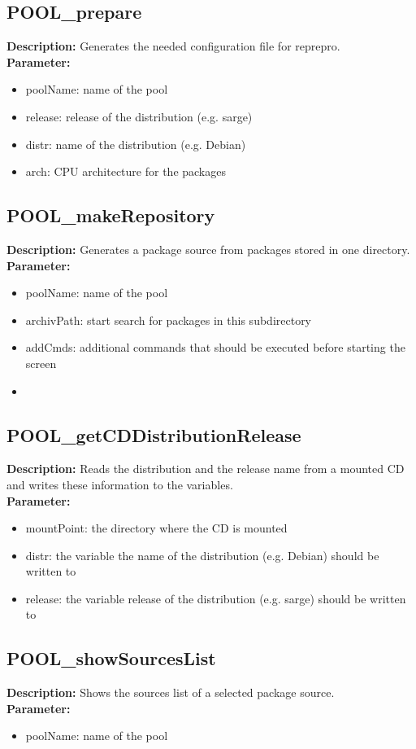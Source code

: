 \subsection{POOL\_prepare}
\textbf{Description:} Generates the needed configuration file for reprepro.\\
\textbf{Parameter:}
\begin{itemize}
\item poolName: name of the pool
\item release: release of the distribution (e.g. sarge)
\item distr: name of the distribution (e.g. Debian)
\item arch: CPU architecture for the packages
\end{itemize}

\subsection{POOL\_makeRepository}
\textbf{Description:} Generates a package source from packages stored in one directory.\\
\textbf{Parameter:}
\begin{itemize}
\item poolName: name of the pool
\item archivPath: start search for packages in this subdirectory
\item addCmds: additional commands that should be executed before starting the screen
\item 
\end{itemize}

\subsection{POOL\_getCDDistributionRelease}
\textbf{Description:} Reads the distribution and the release name from a mounted CD and writes these information to the variables. \\
\textbf{Parameter:}
\begin{itemize}
\item mountPoint: the directory where the CD is mounted
\item distr: the variable the name of the distribution (e.g. Debian) should be written to
\item release: the variable release of the distribution (e.g. sarge) should be written to
\end{itemize}

\subsection{POOL\_showSourcesList}
\textbf{Description:} Shows the sources list of a selected package source.\\
\textbf{Parameter:}
\begin{itemize}
\item poolName: name of the pool
\end{itemize}

